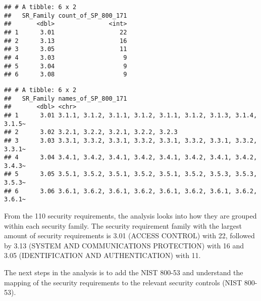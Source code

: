 \documentclass[]{article}
\newenvironment{Shaded}{\begin{snugshade}}{\end{snugshade}}
\newcommand{\KeywordTok}[1]{\textcolor[rgb]{0.13,0.29,0.53}{\textbf{#1}}}
\newcommand{\DataTypeTok}[1]{\textcolor[rgb]{0.13,0.29,0.53}{#1}}
\newcommand{\StringTok}[1]{\textcolor[rgb]{0.31,0.60,0.02}{#1}}
\newcommand{\OperatorTok}[1]{\textcolor[rgb]{0.81,0.36,0.00}{\textbf{#1}}}
\newcommand{\NormalTok}[1]{#1}
\begin{document}
\begin{verbatim}
## # A tibble: 6 x 2
##   SR_Family count_of_SP_800_171
##       <dbl>               <int>
## 1      3.01                  22
## 2      3.13                  16
## 3      3.05                  11
## 4      3.03                   9
## 5      3.04                   9
## 6      3.08                   9
\end{verbatim}

\begin{Shaded}
\end{Shaded}

\begin{verbatim}
## # A tibble: 6 x 2
##   SR_Family names_of_SP_800_171                                           
##       <dbl> <chr>                                                         
## 1      3.01 3.1.1, 3.1.2, 3.1.1, 3.1.2, 3.1.1, 3.1.2, 3.1.3, 3.1.4, 3.1.5~
## 2      3.02 3.2.1, 3.2.2, 3.2.1, 3.2.2, 3.2.3                             
## 3      3.03 3.3.1, 3.3.2, 3.3.1, 3.3.2, 3.3.1, 3.3.2, 3.3.1, 3.3.2, 3.3.1~
## 4      3.04 3.4.1, 3.4.2, 3.4.1, 3.4.2, 3.4.1, 3.4.2, 3.4.1, 3.4.2, 3.4.3~
## 5      3.05 3.5.1, 3.5.2, 3.5.1, 3.5.2, 3.5.1, 3.5.2, 3.5.3, 3.5.3, 3.5.3~
## 6      3.06 3.6.1, 3.6.2, 3.6.1, 3.6.2, 3.6.1, 3.6.2, 3.6.1, 3.6.2, 3.6.1~
\end{verbatim}

From the 110 security requirements, the analysis looks into how they are
grouped within each security family. The security requirement family
with the largest amount of security requirements is 3.01 (ACCESS
CONTROL) with 22, followed by 3.13 (SYSTEM AND COMMUNICATIONS
PROTECTION) with 16 and 3.05 (IDENTIFICATION AND AUTHENTICATION) with
11.

The next steps in the analysis is to add the NIST 800-53 and understand
the mapping of the security requirements to the relevant security
controls (NIST 800-53).
\end{document}
